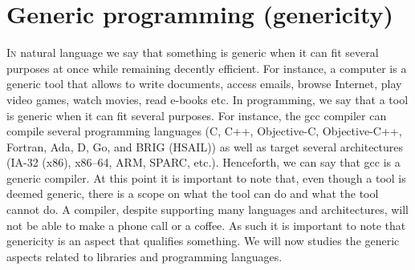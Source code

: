 \chapter{Generic programming (genericity)}
\label{chap:genericity}

\lettrine[lines=2]{I}{n} natural language we say that something is generic when it can fit several purposes at once
while remaining decently efficient. For instance, a computer is a generic tool that allows to write documents, access
emails, browse Internet, play video games, watch movies, read e-books etc. In programming, we say that a tool is generic
when it can fit several purposes. For instance, the gcc compiler can compile several programming languages (C, C++,
Objective-C, Objective-C++, Fortran, Ada, D, Go, and BRIG (HSAIL)) as well as target several architectures (IA-32 (x86),
x86--64, ARM, SPARC, etc.). Henceforth, we can say that gcc is a generic compiler. At this point it is important to note
that, even though a tool is deemed generic, there is a scope on what the tool can do and what the tool cannot do. A
compiler, despite supporting many languages and architectures, will not be able to make a phone call or a coffee. As
such it is important to note that genericity is an aspect that qualifies something. We will now studies the generic
aspects related to libraries and programming languages.

